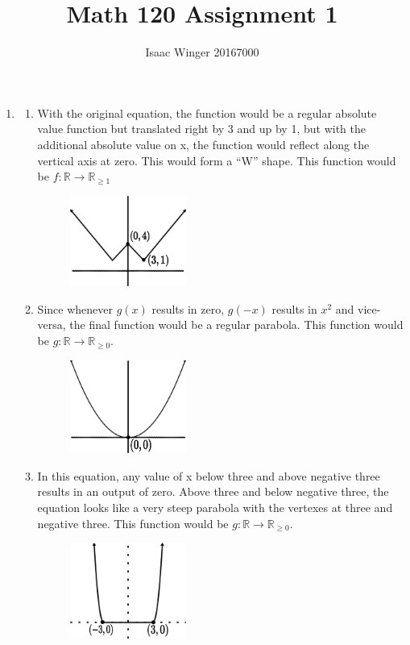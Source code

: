 \documentclass{article}
\title{Math 120 Assignment 1}
\author{Isaac Winger 20167000}
\date{}
\begin{document}
    \begin{enumerate}
            \addtocounter{enumi}{1}
      \item \begin{enumerate}
                    \item With the original equation, the function would be a regular absolute value function but translated right by 3 and up by 1, but with the additional absolute value on x, the function would reflect along the vertical axis at zero. This would form a ``W'' shape. This function would be $f \colon \mathbb{R} \longrightarrow \mathbb{R}_{\geq 1}$
                    \begin{figure}[h]\centering\includegraphics[width=1.5in]{absolutevalue}\end{figure}

              \item Since whenever $g(x)$ results in zero, $g(-x)$ results in $x^{2}$ and vice-versa, the final function would be a regular parabola. This function would be $g \colon \mathbb{R} \longrightarrow \mathbb{R}_{\geq 0}$.
                    \begin{figure}[h]\centering\includegraphics[width=1.5in]{parabola}\end{figure}

              \item In this equation, any value of x below three and above negative three results in an output of zero. Above three and below negative three, the equation looks like a very steep parabola with the vertexes at three and negative three. This function would be $g \colon \mathbb{R} \longrightarrow \mathbb{R}_{\geq 0}$.
              \begin{figure}[h]\centering\includegraphics[width=1.5in]{polynomial}\end{figure}


\end{enumerate}
\end{enumerate}
\end{document}
